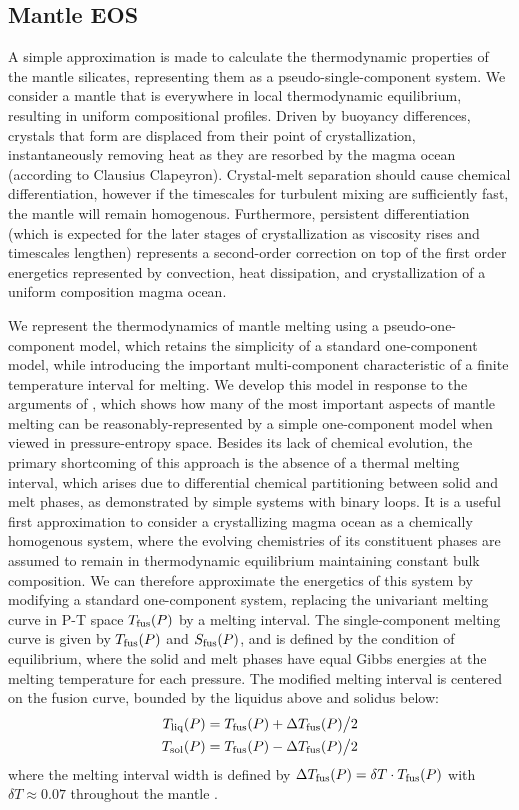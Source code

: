 \subsection{Mantle EOS}
A simple approximation is made to calculate the thermodynamic properties of the mantle silicates, representing them as a pseudo-single-component system.
We consider a mantle that is everywhere in local thermodynamic equilibrium, resulting in uniform compositional profiles.  Driven by buoyancy differences, crystals that form are displaced from their point of crystallization, instantaneously removing heat as they are resorbed by the magma ocean (according to Clausius Clapeyron).  Crystal-melt separation should cause chemical differentiation, however if the timescales for turbulent mixing are sufficiently fast, the mantle will remain homogenous.  Furthermore, persistent differentiation (which is expected for the later stages of crystallization as viscosity rises and timescales lengthen) represents a second-order correction on top of the first order energetics represented by convection, heat dissipation, and crystallization of a uniform composition magma ocean.

We represent the thermodynamics of mantle melting using a pseudo-one-component model, which retains the simplicity of a standard one-component model, while introducing the important multi-component characteristic of a finite temperature interval for melting.  We develop this model in response to the arguments of \cite{SA07}, which shows how many of the most important aspects of mantle melting can be reasonably-represented by a simple one-component model when viewed in pressure-entropy space.  Besides its lack of chemical evolution, the primary shortcoming of this approach is the absence of a thermal melting interval, which arises due to differential chemical partitioning between solid and melt phases, as demonstrated by simple systems with binary loops.  It is a useful first approximation to consider a crystallizing magma ocean as a chemically homogenous system, where the evolving chemistries of its constituent phases are assumed to remain in thermodynamic equilibrium maintaining constant bulk composition.  We can therefore approximate the energetics of this system by modifying a standard one-component system, replacing the univariant melting curve in P-T space $T_{\rm fus}(P)$ by a melting interval.
The single-component melting curve is given by $T_{\rm fus}(P)$ and $S_{\rm fus}(P)$, and is defined by the condition of equilibrium, where the solid and melt phases have equal Gibbs energies at the melting temperature for each pressure.
The modified melting interval is centered on the fusion curve, bounded by the liquidus above and solidus below:
\begin{eqnarray}
T_{\rm liq}(P) = T_{\rm fus}(P) + \Delta T_{\rm fus}(P) \big/ 2\\
T_{\rm sol}(P) = T_{\rm fus}(P) - \Delta T_{\rm fus}(P) \big/ 2
\end{eqnarray}
where the melting interval width is defined by \mbox{$\Delta T_{\rm fus}(P)=\delta T \cdot T_{\rm fus}(P)$} with $\delta T \approx 0.07$ throughout the mantle \citep{SKS09}.
